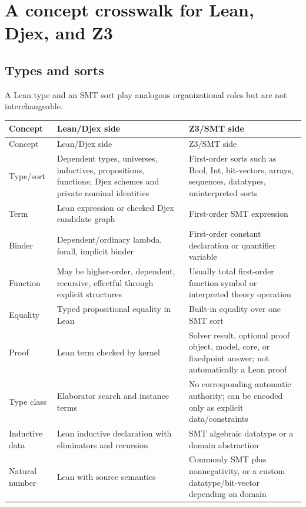 \documentclass[10pt,letterpaper,oneside]{report}
\newcommand{\code}[1]{\texttt{\detokenize{#1}}}
\begin{document}
\chapter{A concept crosswalk for Lean, Djex, and Z3}
\label{chap:crosswalk}

\section{Types and sorts}

A Lean type and an SMT sort play analogous organizational roles but are not interchangeable.

\begin{longtable}{@{}L{0.21\textwidth}L{0.34\textwidth}L{0.39\textwidth}@{}}
\toprule
Concept & Lean/Djex side & Z3/SMT side \\
\midrule
\endfirsthead
\toprule
Concept & Lean/Djex side & Z3/SMT side \\
\midrule
\endhead
\bottomrule
\endfoot
Type/sort & Dependent types, universes, inductives, propositions, functions; Djex schemes and private nominal identities & First-order sorts such as Bool, Int, bit-vectors, arrays, sequences, datatypes, uninterpreted sorts \\
Term & Lean expression or checked Djex candidate graph & First-order SMT expression \\
Binder & Dependent/ordinary lambda, forall, implicit binder & First-order constant declaration or quantifier variable \\
Function & May be higher-order, dependent, recursive, effectful through explicit structures & Usually total first-order function symbol or interpreted theory operation \\
Equality & Typed propositional equality in Lean & Built-in equality over one SMT sort \\
Proof & Lean term checked by kernel & Solver result, optional proof object, model, core, or fixedpoint answer; not automatically a Lean proof \\
Type class & Elaborator search and instance terms & No corresponding automatic authority; can be encoded only as explicit data/constraints \\
Inductive data & Lean inductive declaration with eliminators and recursion & SMT algebraic datatype or a domain abstraction \\
Natural number & Lean \code{Nat} with source semantics & Commonly SMT \code{Int} plus nonnegativity, or a custom datatype/bit-vector depending on domain \\

\end{longtable}
\end{document}
